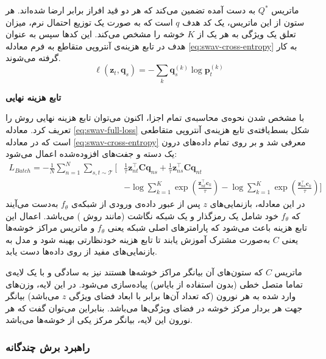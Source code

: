 ماتریس $Q^*$ به دست آمده تضمین می‌کند که هر دو قید افراز برابر ارضا شده‌اند. هر ستون از این ماتریس، یک کد هدف $q$
است که به صورت یک توزیع احتمال نرم، میزان تعلق یک ویژگی به هر یک از 
$K$
خوشه را مشخص می‌کند. این کدها سپس به عنوان هدف در تابع هزینه‌ی آنتروپی متقاطع به فرم معادله \ref{eq:swav-cross-entropy} به کار گرفته می‌شوند.
\begin{equation}
    \ell(\mathbf{z}_t, \mathbf{q}_s) = - \sum_k \mathbf{q}_s^{(k)} \log \mathbf{p}_t^{(k)}
    \label{eq:swav-cross-entropy}
\end{equation}

\vspace{0.5em}
\noindent\textbf{تابع هزینه نهایی}

با مشخص شدن نحوه‌ی محاسبه‌ی تمام اجزا، اکنون می‌توان تابع هزینه نهایی روش  را تعریف کرد. معادله \ref{eq:swav-full-loss} شکل بسط‌یافته‌ی تابع هزینه‌ی آنتروپی متقاطعی است که در معادله \ref{eq:swav-cross-entropy} معرفی شد و بر روی تمام داده‌های درون یک دسته و جفت‌های افزوده‌شده اعمال می‌شود:
\begin{align}
    L_{Batch}=-\frac{1}{N} \sum_{n=1}^{N} \sum_{s,t \sim \mathcal{T}} 
    \Bigg[
    &\frac{1}{\tau} \mathbf{z}_{nt}^\top \mathbf{C}\mathbf{q}_{ns} 
    + \frac{1}{\tau} \mathbf{z}_{ns}^\top \mathbf{C}\mathbf{q}_{nt} \nonumber \\
    &- \log \sum_{k=1}^{K} \exp \left( \frac{\mathbf{z}_{nt}^\top \mathbf{c}_k}{\tau} \right) 
    - \log \sum_{k=1}^{K} \exp \left( \frac{\mathbf{z}_{ns}^\top \mathbf{c}_k}{\tau} \right)
    \Bigg]
    \label{eq:swav-full-loss}
\end{align}
در این معادله، بازنمایی‌های $z$
پس از عبور داده‌ی ورودی از شبکه‌ی $f_\theta$ به‌دست می‌آیند که $f_\theta$
خود شامل یک رمزگذار و یک شبکه نگاشت (مانند روش )
می‌باشد. اعمال این تابع هزینه باعث می‌شود که پارامترهای اصلی شبکه یعنی $f_\theta$ و ماتریس مراکز خوشه‌ها یعنی $C$ به‌صورت مشترک آموزش یابند تا تابع هزینه خودنظارتی بهینه شود و مدل به بازنمایی‌های مفید از روی داده‌ها دست یابد.

ماتریس $C$ که ستون‌های آن بیانگر مراکز خوشه‌ها هستند نیز به سادگی و با یک لایه‌ی تماما متصل خطی (بدون استفاده از بایاس) پیاده‌سازی می‌شود. در این لایه، وزن‌های وارد شده به هر نورون (که تعداد آن‌ها برابر با ابعاد فضای ویژگی $z$ می‌باشد) بیانگر جهت هر بردار مرکز خوشه در فضای ویژگی‌ها می‌باشد. بنابراین می‌توان گفت که هر نورون این لایه، بیانگر مرکز یکی از خوشه‌ها می‌باشد.

\subsubsection{راهبرد برش چندگانه}

